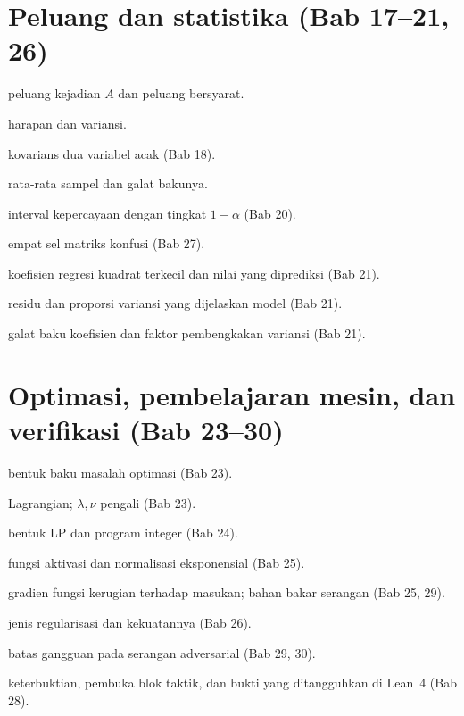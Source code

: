 \documentclass[11pt,a4paper,oneside]{book}
\theoremstyle{definition}
\theoremstyle{plain}
\theoremstyle{remark}
\begin{document}
\section*{Peluang dan statistika (Bab 17--21, 26)}
\begin{description}[style=nextline,itemsep=0.25em]
  \item[$P(A)$, $P(A\mid B)$] peluang kejadian $A$ dan peluang bersyarat.
  \item[{$\mathbb{E}[X]$, $\operatorname{Var}X$}] harapan dan variansi.
  \item[$\operatorname{Cov}(X,Y)$] kovarians dua variabel acak (Bab 18).
  \item[$\bar{X}_n$, $\mathrm{se}$] rata-rata sampel dan galat bakunya.
  \item[$\mathrm{CI}_{1-\alpha}$] interval kepercayaan dengan tingkat
        $1-\alpha$ (Bab 20).
  \item[$\mathrm{TP}$, $\mathrm{FP}$, $\mathrm{FN}$, $\mathrm{TN}$] empat sel
        matriks konfusi (Bab 27).
  \item[$\hat{\beta}$, $\hat{y}=X\hat{\beta}$] koefisien regresi kuadrat
        terkecil dan nilai yang diprediksi (Bab 21).
  \item[$e_i=y_i-\hat{y}_i$, $R^2$] residu dan proporsi variansi yang dijelaskan
        model (Bab 21).
  \item[$\mathrm{se}(\hat{\beta}_j)$, $\mathrm{VIF}_j$] galat baku koefisien dan
        faktor pembengkakan variansi (Bab 21).
\end{description}

\section*{Optimasi, pembelajaran mesin, dan verifikasi (Bab 23--30)}
\begin{description}[style=nextline,itemsep=0.25em]
  \item[$\min f_0(x)$ dengan $f_i(x)\le 0$] bentuk baku masalah optimasi (Bab 23).
  \item[$L(x,\lambda,\nu)$] Lagrangian; $\lambda,\nu$ pengali (Bab 23).
  \item[$c^{\top}x$, $Ax\le b$, $x\in\mathbb{Z}^n$] bentuk LP dan program integer
        (Bab 24).
  \item[$\sigma(\cdot)$, $\mathrm{softmax}$] fungsi aktivasi dan normalisasi
        eksponensial (Bab 25).
  \item[$\nabla_{\mathbf{x}}\ell$] gradien fungsi kerugian terhadap masukan;
        bahan bakar serangan (Bab 25, 29).
  \item[$L_2$, $L_1$, $\lambda_{\text{reg}}$] jenis regularisasi dan kekuatannya
        (Bab 26).
  \item[$\|\delta\|_{\infty}\le\varepsilon$] batas gangguan pada serangan
        adversarial (Bab 29, 30).
  \item[$\vdash$, \texttt{by}, \texttt{sorry}] keterbuktian, pembuka blok taktik,
        dan bukti yang ditangguhkan di Lean~4 (Bab 28).
\end{description}
\end{document}
